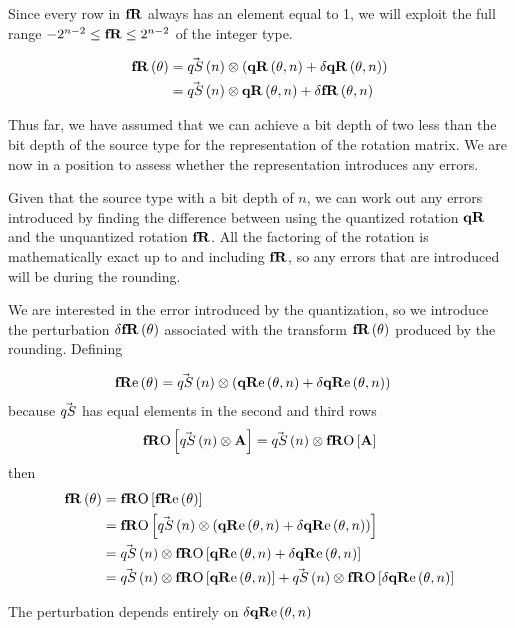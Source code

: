 Since every row in $\fR$ always has an element equal to 1, we will exploit the full range $ -2^{n-2} \le \fR \le 2^{n-2}$ of the integer type. 

\begin{align}
\fR[ \theta ] &= \qS[n]  \otimes \left( \qR[ \theta, n]  + \dqR[ \theta, n ] \right)  \\
                  &= \qS[n]  \otimes \qR[ \theta, n ] +  \dfR[ \theta, n ] 
\end{align}

Thus far, we have assumed that we can achieve a bit depth of two less than the bit depth of the source type for the representation of the rotation matrix. We are now in a position to assess whether the representation introduces any errors.

Given that the source type with a bit depth of $n$, we can work out any errors introduced by finding the difference between using the quantized rotation $\qR$ and the unquantized rotation $\fR$. All the factoring of the rotation is mathematically exact up to and including $\fR$, so any errors that are introduced will be during the rounding.

We are interested in the error introduced by the quantization, so we introduce the perturbation $\dfR[\theta]$ associated with the transform $\fR[\theta]$ produced by the rounding. Defining 

\begin{align*}
\fRe[ \theta ] &=  \qS[ n ]  \otimes  \left( \qRe[ \theta, n ]  + \dqRe[ \theta, n ] \right) 
\end{align*}
because $\qS$ has equal elements in the second and third rows
\begin{equation*}
\fRO \left[ \qS[n] \otimes \mathbf{A} \right] = \qS[n] \otimes \fRO[ \mathbf{A} ]  
\end{equation*}
then
\begin{align*}
\fR[ \theta ] &= \fRO \left[ \fRe[ \theta ] \right] \\
                    &= \fRO \left[ \qS[ n ]  \otimes \left( \qRe[ \theta, n ]  + \dqRe[ \theta, n ] \right) \right]  \\
                   &= \qS[ n ]  \otimes \fRO \left[ \qRe[ \theta, n ]  + \dqRe[ \theta, n ]  \right]  \\
                   &= \qS[ n ]  \otimes \fRO \left[ \qRe[ \theta, n ]   \right]  + \qS[ n ]  \otimes \fRO \left[ \dqRe[ \theta, n ]  \right]  
\end{align*}

The perturbation depends entirely on $\dqRe[\theta,n]$ 

